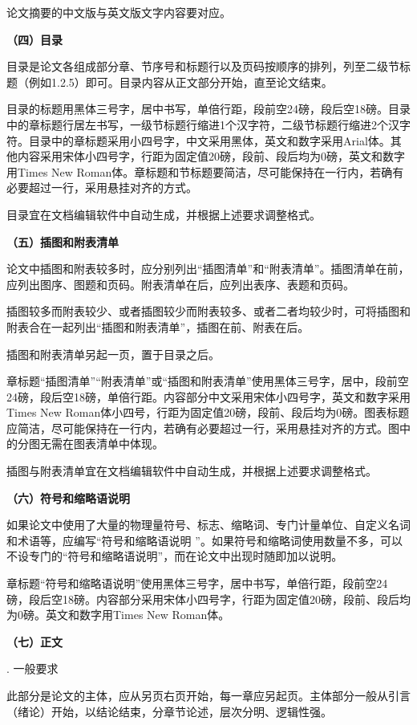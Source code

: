 \documentclass{Diploma}
\begin{document}
\begin{}
论文摘要的中文版与英文版文字内容要对应。

\noindent\textbf{（四）目录}

目录是论文各组成部分章、节序号和标题行以及页码按顺序的排列，列至二级节标题（例如1.2.5）即可。目录内容从正文部分开始，直至论文结束。

目录的标题用黑体三号字，居中书写，单倍行距，段前空24磅，段后空18磅。目录中的章标题行居左书写，一级节标题行缩进1个汉字符，二级节标题行缩进2个汉字符。目录中的章标题采用小四号字，中文采用黑体，英文和数字采用Arial体。其他内容采用宋体小四号字，行距为固定值20磅，段前、段后均为0磅，英文和数字用Times New Roman体。章标题和节标题要简洁，尽可能保持在一行内，若确有必要超过一行，采用悬挂对齐的方式。

目录宜在文档编辑软件中自动生成，并根据上述要求调整格式。

\noindent\textbf{（五）插图和附表清单}

论文中插图和附表较多时，应分别列出“插图清单”和“附表清单”。插图清单在前，应列出图序、图题和页码。附表清单在后，应列出表序、表题和页码。

插图较多而附表较少、或者插图较少而附表较多、或者二者均较少时，可将插图和附表合在一起列出“插图和附表清单”，插图在前、附表在后。

插图和附表清单另起一页，置于目录之后。

章标题“插图清单”“附表清单”或“插图和附表清单”使用黑体三号字，居中，段前空24磅，段后空18磅，单倍行距。内容部分中文采用宋体小四号字，英文和数字采用Times New Roman体小四号，行距为固定值20磅，段前、段后均为0磅。图表标题应简洁，尽可能保持在一行内，若确有必要超过一行，采用悬挂对齐的方式。图中的分图无需在图表清单中体现。

插图与附表清单宜在文档编辑软件中自动生成，并根据上述要求调整格式。

\noindent\textbf{（六）符号和缩略语说明}

如果论文中使用了大量的物理量符号、标志、缩略词、专门计量单位、自定义名词和术语等，应编写“符号和缩略语说明 ”。如果符号和缩略词使用数量不多，可以不设专门的“符号和缩略语说明”，而在论文中出现时随即加以说明。

章标题“符号和缩略语说明”使用黑体三号字，居中书写，单倍行距，段前空24 磅，段后空18磅。内容部分采用宋体小四号字，行距为固定值20磅，段前、段后均为0磅。英文和数字用Times New Roman体。

\noindent\textbf{（七）正文}

. 一般要求

此部分是论文的主体，应从另页右页开始，每一章应另起页。主体部分一般从引言（绪论）开始，以结论结束，分章节论述，层次分明、逻辑性强。


\end{}
\end{document}
